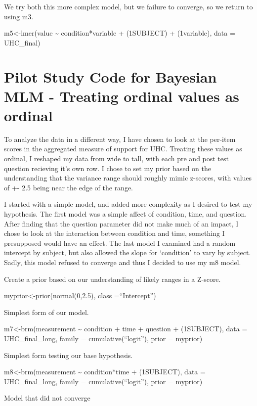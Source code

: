 \documentclass[
]{article}
\begin{document}
We try both this more complex model, but we failure to converge, so we
return to using m3.

m5\textless-lmer(value \textasciitilde{} condition*variable +
(1\textbar SUBJECT) + (1\textbar variable), data = UHC\_final)

\hypertarget{pilot-study-code-for-bayesian-mlm---treating-ordinal-values-as-ordinal}{%
\section{Pilot Study Code for Bayesian MLM - Treating ordinal values as
ordinal}\label{pilot-study-code-for-bayesian-mlm---treating-ordinal-values-as-ordinal}}

To analyze the data in a different way, I have chosen to look at the
per-item scores in the aggregated measure of support for UHC. Treating
these values as ordinal, I reshaped my data from wide to tall, with each
pre and post test question recieving it's own row. I chose to set my
prior based on the understanding that the variance range should roughly
mimic z-scores, with values of +- 2.5 being near the edge of the range.

I started with a simple model, and added more complexity as I desired to
test my hypothesis. The first model was a simple affect of condition,
time, and question. After finding that the question parameter did not
make much of an impact, I chose to look at the interaction between
condition and time, something I presupposed would have an effect. The
last model I examined had a random intercept by subject, but also
allowed the slope for `condition' to vary by subject. Sadly, this model
refused to converge and thus I decided to use my m8 model.

Create a prior based on our understanding of likely ranges in a Z-score.

myprior\textless-prior(normal(0,2.5), class =``Intercept'')

Simplest form of our model.

m7\textless-brm(measurement \textasciitilde{} condition + time +
question + (1\textbar SUBJECT), data = UHC\_final\_long, family =
cumulative(``logit''), prior = myprior)

Simplest form testing our base hypothesis.

m8\textless-brm(measurement \textasciitilde{} condition*time +
(1\textbar SUBJECT), data = UHC\_final\_long, family =
cumulative(``logit''), prior = myprior)

Model that did not converge
\end{document}
